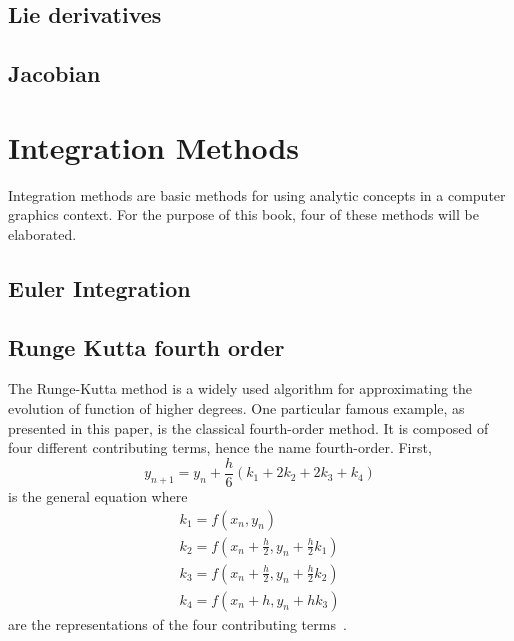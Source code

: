 \subsection{Lie derivatives}
\label{subsec:lie}

\subsection{Jacobian}
\label{subsec:jacobian}

\section{Integration Methods}
\label{sec:integration}

Integration methods are basic methods for using analytic concepts in a 
computer graphics context. For the purpose of this book, four of these 
methods will be elaborated.

\subsection{Euler Integration}
\label{subsec:euler}

\subsection{Runge Kutta fourth order}
\label{subsec:runge-kutta}


The Runge-Kutta method is a widely used algorithm for approximating the 
evolution of function of higher degrees. One particular famous example, as presented
in this paper, is the classical fourth-order method. It is composed of four different 
contributing terms, hence the name fourth-order. First,
\begin{equation}
	y_{n+1} = y_n + \frac h6 (k_1 + 2k_2 + 2k_3 + k_4)
\end{equation}
is the general equation where
\begin{equation}
	\begin{gathered}
		k_1 = f(x_n, y_n) \\
		k_2 = f(x_n + \frac h2, y_n + \frac h2 k_1) \\
		k_3 = f(x_n + \frac h2, y_n + \frac h2 k_2) \\
		k_4 = f(x_n + h, y_n + hk_3)
	\end{gathered}
\end{equation}
are the representations of the four contributing terms~\cite{Book:numerical_analysis_01_suli}. 


